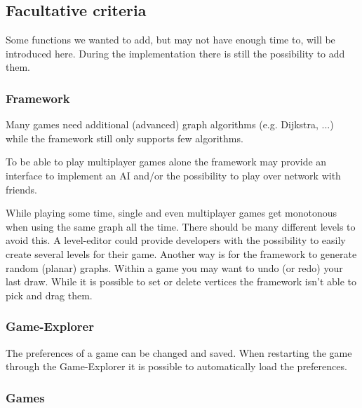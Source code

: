 \subsection{Facultative criteria}
\label{facultative-criteria}
Some functions we wanted to add, but may not have enough time to, will be introduced here. During the implementation there is still the possibility to add them.

\subsubsection{Framework}
Many \glspl{game} need additional (advanced) \gls{graph} \glspl{algorithm} (e.g. Dijkstra, ...)	while the \gls{framework} still only supports few algorithms. \par
To be able to play multiplayer games alone the framework may provide an interface to implement an \gls{AI} and/or the possibility to play over network with friends. \par
While playing some time, single and even multiplayer games get monotonous when using the same graph all the time. There should be many different \glspl{level} to avoid this. A \gls{level-editor} could provide \glspl{developer} with the possibility to easily create several levels for their game. Another way is for the framework to generate random (\gls{planar}) graphs.
Within a game you may want to \gls{undo} (or redo) your last draw.
While it is possible to set or delete vertices the framework isn't able to pick and drag them.

\subsubsection{Game-Explorer}
The preferences of a game can be changed and saved. When restarting the game through the Game-Explorer it is possible to automatically load the preferences. \\

\subsubsection{Games}

